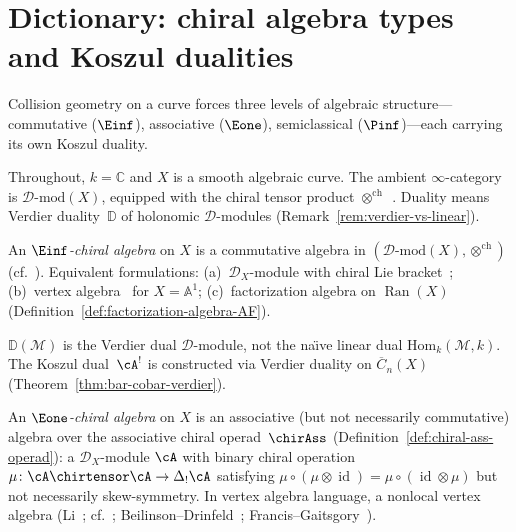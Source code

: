 \section{Dictionary: chiral algebra types and Koszul dualities}
\label{sec:dictionary}

Collision geometry on a curve forces three levels of algebraic
structure---commutative ($\Einf$), associative ($\Eone$),
semiclassical ($\Pinf$)---each carrying its own Koszul duality.

\begin{definition}[\texorpdfstring{$\Einf$}{E-infinity}-chiral algebra = vertex algebra]
\label{def:einf-chiral}
Throughout, $k = \mathbb{C}$ and $X$ is a smooth algebraic curve.
The ambient $\infty$-category is $\mathcal{D}\text{-mod}(X)$,
equipped with the chiral tensor product
$\otimes^{\mathrm{ch}}$~\cite[\S3.4]{BD04}.  Duality means
Verdier duality~$\mathbb{D}$ of holonomic $\mathcal{D}$-modules
(Remark~\ref{rem:verdier-vs-linear}).

An \emph{$\Einf$-chiral algebra} on $X$ is a commutative algebra
in $(\mathcal{D}\text{-mod}(X),\allowbreak
\otimes^{\mathrm{ch}})$
(cf.~\cite[§5.1]{HA}).
Equivalent formulations:
(a)~$\mathcal{D}_X$-module with chiral Lie
bracket~\cite[\S3.3]{BD04};
(b)~vertex algebra~\cite[\S3.7]{FBZ04} for $X = \mathbb{A}^1$;
(c)~factorization algebra on $\operatorname{Ran}(X)$
(Definition~\ref{def:factorization-algebra-AF}).
\end{definition}

\begin{remark}
\label{rem:verdier-vs-linear}
$\mathbb{D}(\mathcal{M})$ is the Verdier dual
$\mathcal{D}$-module, not the na\"{\i}ve linear dual
$\mathrm{Hom}_k(\mathcal{M}, k)$.  The Koszul
dual~$\cA^!$ is constructed via Verdier duality on
$\overline{C}_n(X)$
(Theorem~\ref{thm:bar-cobar-verdier}).
\end{remark}

\begin{definition}[\texorpdfstring{$\Eone$}{E1}-chiral algebra = nonlocal vertex algebra]
\label{def:e1-chiral}
An \emph{$\Eone$-chiral algebra} on $X$ is an associative (but not
necessarily commutative) algebra over the associative chiral
operad~$\chirAss$ (Definition~\ref{def:chiral-ass-operad}):
a $\mathcal{D}_X$-module $\cA$ with binary chiral operation
$\mu\colon \cA \chirtensor \cA \to \Delta_!\cA$
satisfying $\mu \circ (\mu \otimes \operatorname{id})
= \mu \circ (\operatorname{id} \otimes \mu)$
but not necessarily skew-symmetry.
In vertex algebra language, a nonlocal vertex algebra
(Li~\cite{Li96}; cf.~\cite[\S4.1]{HA};
Beilinson--Drinfeld~\cite[Theorem~3.4.9]{BD04};
Francis--Gaitsgory~\cite{FG12}).
\end{definition}

